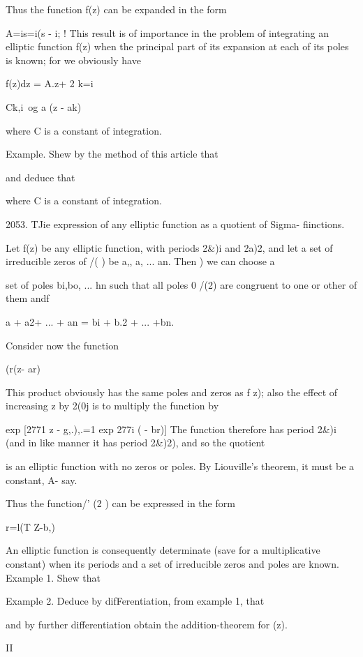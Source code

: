 {Thus the function f(z) can be expanded in the form

A=is=i(s - i; ! This result is of importance in the problem of
integrating an elliptic function f(z) when the principal part of its
expansion at each of its poles is known; for we obviously have

f(z)dz = A.z+ 2 k=i

Ck,i\ og a (z - ak)

where C is a constant of integration.

Example. Shew by the method of this article that

and deduce that

where C is a constant of integration.

2053. TJie expression of any elliptic function as a quotient of Sigma-
fiinctions.

Let f(z) be any elliptic function, with periods 2\&)i and 2a)2, and
let a set of irreducible zeros of /( ) be a,, a, ... an. Then
) we can choose a

%
%

set of poles bi,bo, ... hn such that all poles 0 /(2) are congruent to
one or other of them andf

a + a2+ ... + an = bi + b.2 + ... +bn.

Consider now the function

  (r(z- ar)

This product obviously has the same poles and zeros as f z); also the
effect of increasing z by 2(0j is to multiply the function by

  exp [2771 z - g,.),.=1 exp 277i ( - br)] The function therefore has
period 2\&)i (and in like manner it has period 2\&)2), and so the
quotient

is an elliptic function with no zeros or poles. By Liouville's
theorem, it must be a constant, A- say.

Thus the function/' (2 ) can be expressed in the form

r=l(T Z-b,)

An elliptic function is consequently determinate (save for a
multiplicative constant) when its periods and a set of irreducible
zeros and poles are known. Example 1. Shew that

Example 2. Deduce by difFerentiation, from example 1, that

and by further differentiation obtain the addition-theorem for (z).

II

}
